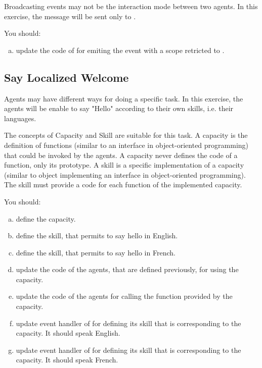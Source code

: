 \documentclass[article,english,nodocumentinfo]{utbmciadreport}
\begin{document}
Broadcasting events may not be the interaction mode between two agents.
In this exercise, the  message will be sent only to .

You should:
\begin{enumerate}[a)]
\item update the code of  for emiting the event with a scope retricted to .
\end{enumerate}

\subsection{Say Localized Welcome}

Agents may have different ways for doing a specific task.
In this exercise, the agents will be enable to say "Hello" according to their own skills, i.e. their languages.

The concepts of Capacity and Skill are suitable for this task.
A capacity is the definition of functions (similar to an interface in object-oriented programming) that could be invoked by the agents. A capacity never defines the code of a function, only its prototype.
A skill is a specific implementation of a capacity (similar to object implementing an interface in object-oriented programming). The skill must provide a code for each function of the implemented capacity.

You should:
\begin{enumerate}[a)]
\item define the  capacity.
\item define the  skill, that permits to say hello in English.
\item define the  skill, that permits to say hello in French.
\item update the code of the agents, that are defined previously, for using the  capacity.
\item update the code of the agents for calling the function provided by the  capacity.
\item update  event handler of  for defining its skill that is corresponding to the  capacity. It should speak English.
\item update  event handler of  for defining its skill that is corresponding to the  capacity. It should speak French.
\end{enumerate}
\end{document}
